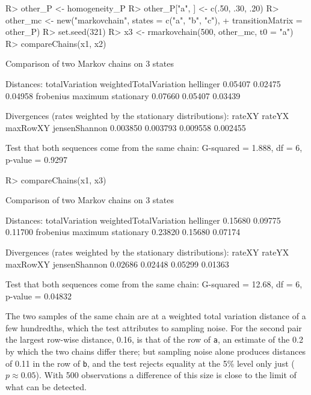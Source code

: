 \documentclass[
  nojss]{jss}
\begin{document}
\begin{CodeChunk}
\begin{CodeInput}
R> other_P <- homogeneity_P
R> other_P["a", ] <- c(.50, .30, .20)
R> other_mc <- new("markovchain", states = c("a", "b", "c"),
+                 transitionMatrix = other_P)
R> set.seed(321)
R> x3 <- rmarkovchain(500, other_mc, t0 = "a")
R> compareChains(x1, x2)
\end{CodeInput}
\begin{CodeOutput}
Comparison of two Markov chains on 3 states

Distances:
        totalVariation weightedTotalVariation              hellinger 
               0.05407                0.02475                0.04958 
             frobenius                maximum             stationary 
               0.07660                0.05407                0.03439 

Divergences (rates weighted by the stationary distributions):
       rateXY        rateYX      maxRowXY jensenShannon 
     0.003850      0.003793      0.009558      0.002455 

Test that both sequences come from the same chain:
  G-squared = 1.888, df = 6, p-value = 0.9297
\end{CodeOutput}
\begin{CodeInput}
R> compareChains(x1, x3)
\end{CodeInput}
\begin{CodeOutput}
Comparison of two Markov chains on 3 states

Distances:
        totalVariation weightedTotalVariation              hellinger 
               0.15680                0.09775                0.11700 
             frobenius                maximum             stationary 
               0.23820                0.15680                0.07174 

Divergences (rates weighted by the stationary distributions):
       rateXY        rateYX      maxRowXY jensenShannon 
      0.02686       0.02448       0.05299       0.01363 

Test that both sequences come from the same chain:
  G-squared = 12.68, df = 6, p-value = 0.04832
\end{CodeOutput}
\end{CodeChunk}

The two samples of the same chain are at a weighted total variation
distance of a few hundredths, which the test attributes to sampling noise.
For the second pair the largest row-wise distance, 0.16, is that of the row
of \texttt{a}, an estimate of the 0.2 by which the two chains differ there; but
sampling noise alone produces distances of 0.11 in the row of \texttt{b}, and the
test rejects equality at the 5\% level only just (\(p \approx 0.05\)). With
500 observations a difference of this size is close to the limit of what can
be detected.
\end{document}
